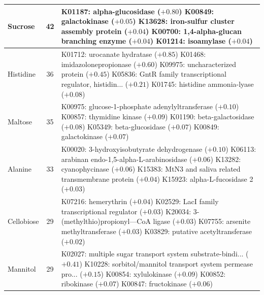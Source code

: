 \begin{table}[ht]
\begin{tabular}{|l|c|p{10.5cm}|}
\hline
Sucrose & 42 & K01187: alpha-glucosidase ($+0.80$) \newline K00849: galactokinase ($+0.05$) \newline K13628: iron-sulfur cluster assembly protein ($+0.04$) \newline K00700: 1,4-alpha-glucan branching enzyme ($+0.04$) \newline K01214: isoamylase ($+0.04$) \\
\hline
Histidine & 36 & K01712: urocanate hydratase ($+0.85$) \newline K01468: imidazolonepropionase ($+0.60$) \newline K09975: uncharacterized protein ($+0.45$) \newline K05836: GntR family transcriptional regulator, histidin... ($+0.21$) \newline K01745: histidine ammonia-lyase ($+0.08$) \\
\hline
Maltose & 35 & K00975: glucose-1-phosphate adenylyltransferase ($+0.10$) \newline K00857: thymidine kinase ($+0.09$) \newline K01190: beta-galactosidase ($+0.08$) \newline K05349: beta-glucosidase ($+0.07$) \newline K00849: galactokinase ($+0.07$) \\
\hline
Alanine & 33 & K00020: 3-hydroxyisobutyrate dehydrogenase ($+0.10$) \newline K06113: arabinan endo-1,5-alpha-L-arabinosidase ($+0.06$) \newline K13282: cyanophycinase ($+0.06$) \newline K15383: MtN3 and saliva related transmembrane protein ($+0.04$) \newline K15923: alpha-L-fucosidase 2 ($+0.03$) \\
\hline
Cellobiose & 29 & K07216: hemerythrin ($+0.04$) \newline K02529: LacI family transcriptional regulator ($+0.03$) \newline K20034: 3-(methylthio)propionyl---CoA ligase ($+0.03$) \newline K07755: arsenite methyltransferase ($+0.03$) \newline K03829: putative acetyltransferase ($+0.02$) \\
\hline
Mannitol & 29 & K02027: multiple sugar transport system substrate-bindi... ($+0.41$) \newline K10228: sorbitol/mannitol transport system permease pro... ($+0.15$) \newline K00854: xylulokinase ($+0.09$) \newline K00852: ribokinase ($+0.07$) \newline K00847: fructokinase ($+0.06$) \\

\end{tabular}
\end{table}
